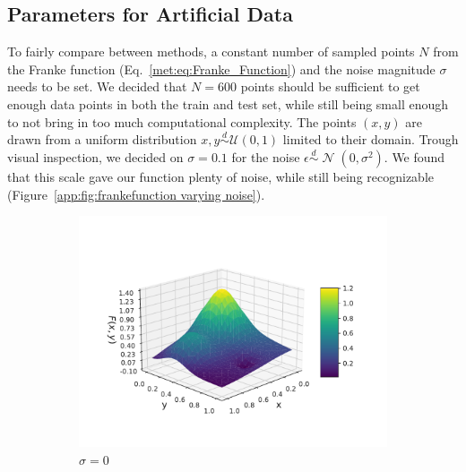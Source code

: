 \documentclass[twocolumn,english,notitlepage]{article}
\newcommand{\pclosed}[1]{\left(#1\right)}
\newcommand{\normal}[2]{\operatorname{\mathcal{N}}\pclosed{#1,#2}}
\newcommand{\distas}{\overset{d}{\sim}}
\begin{document}
\begin{appendices}
    \section{Parameters for Artificial Data} \label{app:sec:frankefunction N and sigma}
        To fairly compare between methods, a constant number of sampled points $N$ from the Franke function (Eq.~\ref{met:eq:Franke_Function}) and the noise magnitude $\sigma$ needs to be set. We decided that $N = 600$ points should be sufficient to get enough data points in both the train and test set, while still being small enough to not bring in too much computational complexity. The points $(x,y)$ are drawn from a uniform distribution $x,y \distas \mathcal{U}(0,1)$ limited to their domain. Trough visual inspection, we decided on $\sigma = 0.1$ for the noise $\epsilon \distas \normal{0}{\sigma^2}$. We found that this scale gave our function plenty of noise, while still being recognizable (Figure~\ref{app:fig:frankefunction varying noise}).   
        \begin{figure}
            \begin{subfigure}{.5\textwidth}
                \centering
                \includegraphics[width=\linewidth]{franke_functions_0.pdf}
                \caption{$\sigma = 0$}
                \end{subfigure}
            \hfill
            \begin{subfigure}{.5\textwidth}
                \centering

\end{subfigure}
\end{figure}
\end{appendices}
\end{document}
